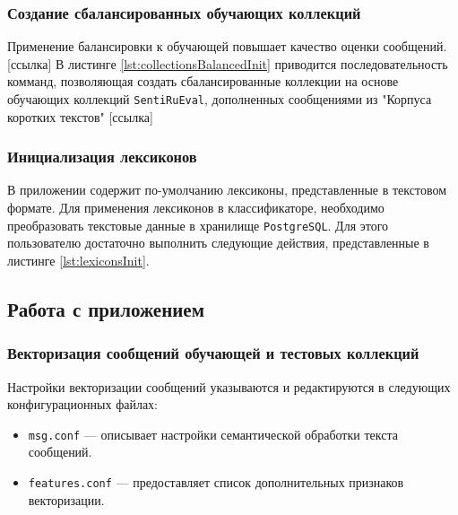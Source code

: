         \subsubsection{Создание сбалансированных обучающих коллекций}
        Применение балансировки к обучающей повышает качество оценки сообщений. [ссылка]
        В листинге \ref{lst:collectionsBalancedInit} приводится последовательность
        комманд, позволяющая создать сбалансированные коллекции на основе обучающих
        коллекций {\tt SentiRuEval}, дополненных сообщениями из "Корпуса коротких текстов" [ссылка]
        \lstset{style=bash}
        

        \subsubsection{Инициализация лексиконов}
        В приложении содержит по-умолчанию лексиконы, представленные в текстовом
        формате. Для применения лексиконов в классификаторе, необходимо преобразовать
        текстовые данные в хранилище {\tt PostgreSQL}. Для этого пользователю
        достаточно выполнить следующие действия, представленные в листинге \ref{lst:lexiconsInit}.
        \lstset{style=bash}
        

    \subsection{Работа с приложением}
        \subsubsection{Векторизация сообщений обучающей и тестовых коллекций}
        \label{sec:usage_vectorize}
        Настройки векторизации сообщений указываются и редактируются в следующих
        конфигурационных файлах:
        \begin{itemize}
            \item {\tt msg.conf} --- описывает настройки семантической обработки текста
            сообщений. %
            \item {\tt features.conf} --- предоставляет список дополнительных признаков векторизации. %
        \end{itemize}


